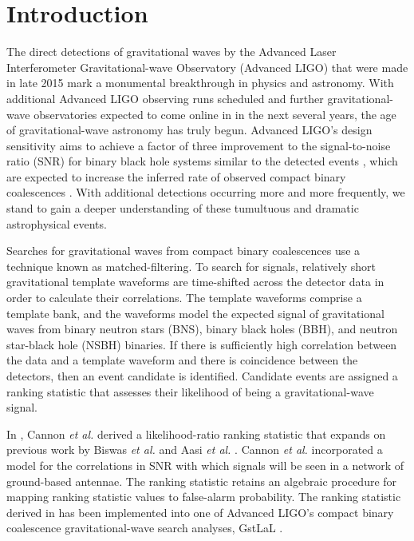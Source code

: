 \documentclass[twocolumn,showpacs,unsortedaddress,superscriptaddress,showkeys,nofootinbib,preprintnumbers,letterpaper]{revtex4-1}
\begin{document}
\maketitle
%


\section{Introduction}

The direct detections of gravitational waves by the Advanced Laser Interferometer Gravitational-wave Observatory (Advanced LIGO) that were made in late 2015 \cite{Abbott:2016blz, Abbott:2016nmj, TheLIGOScientific:2016pea} mark a monumental breakthrough in physics and astronomy. With additional Advanced LIGO observing runs scheduled and further gravitational-wave observatories expected to come online in in the next several years, the age of gravitational-wave astronomy has truly begun. Advanced LIGO's design sensitivity aims to achieve a factor of three improvement to the signal-to-noise ratio (SNR) for binary black hole systems similar to the detected events \cite{TheLIGOScientific:2016agk}, which are expected to increase the inferred rate of observed compact binary coalescences \cite{Abbott:2016nhf}. With additional detections occurring more and more frequently, we stand to gain a deeper understanding of these tumultuous and dramatic astrophysical events. 

Searches for gravitational waves from compact binary coalescences use a technique known as matched-filtering. To search for signals, relatively short gravitational template waveforms are time-shifted across the detector data in order to calculate their correlations. The template waveforms comprise a template bank, and the waveforms model the expected signal of gravitational waves from binary neutron stars (BNS), binary black holes (BBH), and neutron star-black hole (NSBH) binaries. If there is sufficiently high correlation between the data and a template waveform and there is coincidence between the detectors, then an event candidate is identified. Candidate events are assigned a ranking statistic that assesses their likelihood of being a gravitational-wave signal. 

In \cite{2015arXiv150404632C}, Cannon {\it et al.} derived a likelihood-ratio ranking statistic that expands on previous work by Biswas {\it et al.} \cite{Biswas:2012tv} and Aasi {\it et al.} \cite{Aasi:2013vna}. Cannon {\it et al.} incorporated a model for the correlations in SNR with which signals will be seen in a network of ground-based antennae. The ranking statistic retains an algebraic procedure for mapping ranking statistic values to false-alarm probability. The ranking statistic derived in \cite{2015arXiv150404632C} has been implemented into one of Advanced LIGO's compact binary coalescence gravitational-wave search analyses, GstLaL \cite{Cannon:2011vi,Privitera:2013xza,Messick:2016}.
\end{document}
